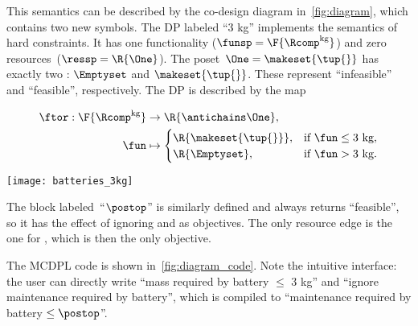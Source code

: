 This semantics can be described by the co-design diagram in~\cref{fig:diagram}, which contains two new symbols.
The DP labeled ``3 kg'' implements the semantics of hard constraints.
It has one functionality ($\funsp=\F{\Rcomp^{\text{kg}}}$) and zero resources~($\ressp=\R{\One}$).
The poset~$\One=\makeset{\tup{ } }$ has exactly two : $\Emptyset$ and $\makeset{\tup{ } }$.
These represent ``infeasible'' and ``feasible'', respectively.
The DP is described by the map
\quad\quad
\begin{minipage}[c]{6.5cm}
    \begin{align}
        \ftor:\F{\Rcomp^{\text{kg}}} & \rightarrow\R{\antichains\One}, \\
        \fun                         & \mapsto\begin{cases}
                                                  \R{\makeset{\tup{ } }}, & \text{if }\fun\leq\text{3 kg}, \\
                                                  \R{\Emptyset},          & \text{if }\fun>\text{3 kg}.
                                              \end{cases}
    \end{align}

\end{minipage}\quad\texttt{[image: batteries\_3kg]}

\smallskip{}

\noindent The block labeled~``$\postop$'' is similarly defined and always returns ``feasible'', so it has the effect of ignoring  and  as objectives.
The only resource edge is the one for , which is then the only objective.

The MCDPL code is shown in~\cref{fig:diagram_code}.
Note the intuitive interface: the user can directly write ``mass required by battery $\leq$ 3 kg'' and ``ignore maintenance required by battery'', which is compiled to ``maintenance required by battery $\leq\postop$''.

